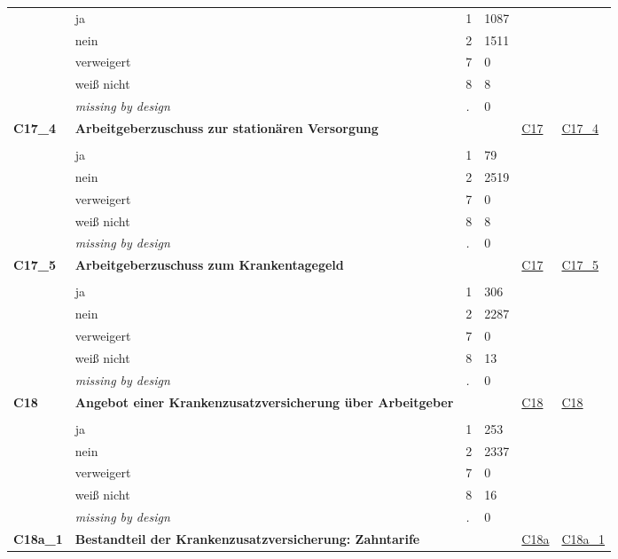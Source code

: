 \begin{longtable}{| L{2.45cm} | L{6cm} | C{1.5cm} | R{1cm} | C{2.25cm} | C{2.25cm} |}
   & ja & 1 & 1087 &  &  \\ 
   & nein & 2 & 1511 &  &  \\ 
   & verweigert & 7 & 0 &  &  \\ 
   & weiß nicht & 8 & 8 &  &  \\ 
   & \textit{missing by design} & \textit{.} & 0 &  &  \\ 
   \midrule
\textbf{C17\_4}\label{var:C17:4} & \textbf{Arbeitgeberzuschuss zur stationären Versorgung} &  &  & \hyperref[C17]{C17} & \hyperref[var:suf:C17:4]{C17\_4} \\ 
   &  &  &  &  &  \\ 
   & ja & 1 & 79 &  &  \\ 
   & nein & 2 & 2519 &  &  \\ 
   & verweigert & 7 & 0 &  &  \\ 
   & weiß nicht & 8 & 8 &  &  \\ 
   & \textit{missing by design} & \textit{.} & 0 &  &  \\ 
   \midrule
\textbf{C17\_5}\label{var:C17:5} & \textbf{Arbeitgeberzuschuss zum Krankentagegeld} &  &  & \hyperref[C17]{C17} & \hyperref[var:suf:C17:5]{C17\_5} \\ 
   &  &  &  &  &  \\ 
   & ja & 1 & 306 &  &  \\ 
   & nein & 2 & 2287 &  &  \\ 
   & verweigert & 7 & 0 &  &  \\ 
   & weiß nicht & 8 & 13 &  &  \\ 
   & \textit{missing by design} & \textit{.} & 0 &  &  \\ 
   \midrule
\textbf{C18}\label{var:C18} & \textbf{Angebot einer Krankenzusatzversicherung über Arbeitgeber} &  &  & \hyperref[C18]{C18} & \hyperref[var:suf:C18]{C18} \\ 
   &  &  &  &  &  \\ 
   & ja & 1 & 253 &  &  \\ 
   & nein & 2 & 2337 &  &  \\ 
   & verweigert & 7 & 0 &  &  \\ 
   & weiß nicht & 8 & 16 &  &  \\ 
   & \textit{missing by design} & \textit{.} & 0 &  &  \\ 
   \midrule
\textbf{C18a\_1}\label{var:C18a:1} & \textbf{Bestandteil der Krankenzusatzversicherung: Zahntarife} &  &  & \hyperref[C18a]{C18a} & \hyperref[var:suf:C18a:1]{C18a\_1} \\ 

\end{longtable}
